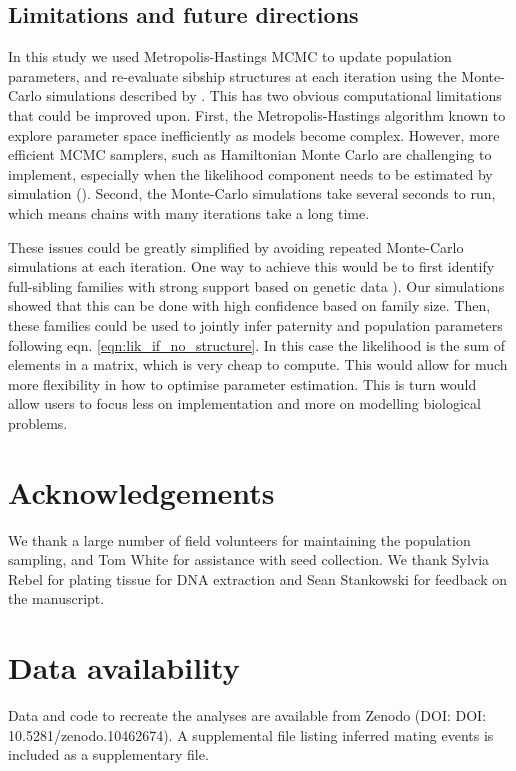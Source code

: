 \documentclass[10pt, a4paper, twocolumn]{article} %
\begin{document}
\subsection{Limitations and future directions}

In this study we used Metropolis-Hastings MCMC to update population parameters, and re-evaluate sibship structures at each iteration using the Monte-Carlo simulations described by \textcite{ellis2018efficient}.
This has two obvious computational limitations that could be improved upon.
First, the Metropolis-Hastings algorithm known to explore parameter space inefficiently as models become complex.
However, more efficient MCMC samplers, such as Hamiltonian Monte Carlo are challenging to implement, especially when the likelihood component needs to be estimated by simulation (\cite{betancourt2017conceptual}).
Second, the Monte-Carlo simulations take several seconds to run, which means chains with many iterations take a long time.

These issues could be greatly simplified by avoiding repeated Monte-Carlo simulations at each iteration.
One way to achieve this would be to first identify full-sibling families with strong support based on genetic data \cite{ellis2018efficient}).
Our simulations showed that this can be done with high confidence based on family size.
Then, these families could be used to jointly infer paternity and population parameters following eqn. \ref{eqn:lik_if_no_structure}.
In this case the likelihood is the sum of elements in a matrix, which is very cheap to compute.
This would allow for much more flexibility in how to optimise parameter estimation.
This is turn would allow users to focus less on implementation and more on modelling biological problems.


\section{Acknowledgements}

We thank a large number of field volunteers for maintaining the population sampling, and Tom White for assistance with seed collection. We thank Sylvia Rebel for plating tissue for DNA extraction and Sean Stankowski for feedback on the manuscript.

\section{Data availability}

Data and code to recreate the analyses are available from Zenodo (DOI:  DOI: 10.5281/zenodo.10462674). A supplemental file listing inferred mating events is included as a supplementary file.
\end{document}

